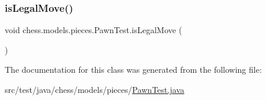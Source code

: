 \subsubsection{\texorpdfstring{is\+Legal\+Move()}{isLegalMove()}}
{\footnotesize\ttfamily void chess.\+models.\+pieces.\+Pawn\+Test.\+is\+Legal\+Move (\begin{DoxyParamCaption}{ }\end{DoxyParamCaption})}



The documentation for this class was generated from the following file\+:\begin{DoxyCompactItemize}
\item 
src/test/java/chess/models/pieces/\mbox{\hyperlink{_pawn_test_8java}{Pawn\+Test.\+java}}\end{DoxyCompactItemize}
